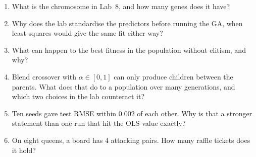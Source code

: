 \begin{quickcheck}
\begin{enumerate}
  \item What is the chromosome in Lab~8, and how many genes does it have?
  \item Why does the lab standardise the predictors before running the GA, when least squares would give the same fit either way?
  \item What can happen to the best fitness in the population without elitism, and why?
  \item Blend crossover with $\alpha\in[0,1]$ can only produce children between the parents. What does that do to a population over many generations, and which two choices in the lab counteract it?
  \item Ten seeds gave test RMSE within $0.002$ of each other. Why is that a stronger statement than one run that hit the OLS value exactly?
  \item On eight queens, a board has 4 attacking pairs. How many raffle tickets does it hold?
\end{enumerate}
\end{quickcheck}
